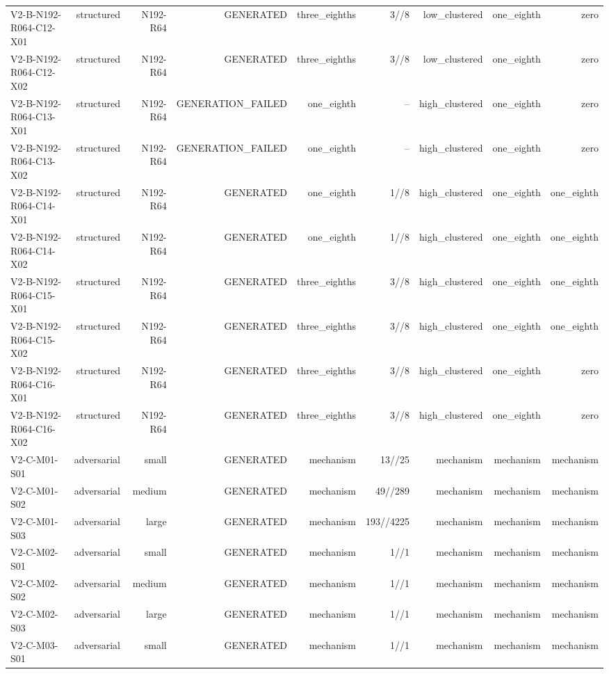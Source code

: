 {\begin{longtable}{lrrrrrrrr}
V2-B-N192-R064-C12-X01 & structured & N192-R64 & GENERATED & three\_eighths & 3//8 & low\_clustered & one\_eighth & zero \\
V2-B-N192-R064-C12-X02 & structured & N192-R64 & GENERATED & three\_eighths & 3//8 & low\_clustered & one\_eighth & zero \\
V2-B-N192-R064-C13-X01 & structured & N192-R64 & GENERATION\_FAILED & one\_eighth & -- & high\_clustered & one\_eighth & zero \\
V2-B-N192-R064-C13-X02 & structured & N192-R64 & GENERATION\_FAILED & one\_eighth & -- & high\_clustered & one\_eighth & zero \\
V2-B-N192-R064-C14-X01 & structured & N192-R64 & GENERATED & one\_eighth & 1//8 & high\_clustered & one\_eighth & one\_eighth \\
V2-B-N192-R064-C14-X02 & structured & N192-R64 & GENERATED & one\_eighth & 1//8 & high\_clustered & one\_eighth & one\_eighth \\
V2-B-N192-R064-C15-X01 & structured & N192-R64 & GENERATED & three\_eighths & 3//8 & high\_clustered & one\_eighth & one\_eighth \\
V2-B-N192-R064-C15-X02 & structured & N192-R64 & GENERATED & three\_eighths & 3//8 & high\_clustered & one\_eighth & one\_eighth \\
V2-B-N192-R064-C16-X01 & structured & N192-R64 & GENERATED & three\_eighths & 3//8 & high\_clustered & one\_eighth & zero \\
V2-B-N192-R064-C16-X02 & structured & N192-R64 & GENERATED & three\_eighths & 3//8 & high\_clustered & one\_eighth & zero \\
V2-C-M01-S01 & adversarial & small & GENERATED & mechanism & 13//25 & mechanism & mechanism & mechanism \\
V2-C-M01-S02 & adversarial & medium & GENERATED & mechanism & 49//289 & mechanism & mechanism & mechanism \\
V2-C-M01-S03 & adversarial & large & GENERATED & mechanism & 193//4225 & mechanism & mechanism & mechanism \\
V2-C-M02-S01 & adversarial & small & GENERATED & mechanism & 1//1 & mechanism & mechanism & mechanism \\
V2-C-M02-S02 & adversarial & medium & GENERATED & mechanism & 1//1 & mechanism & mechanism & mechanism \\
V2-C-M02-S03 & adversarial & large & GENERATED & mechanism & 1//1 & mechanism & mechanism & mechanism \\
V2-C-M03-S01 & adversarial & small & GENERATED & mechanism & 1//1 & mechanism & mechanism & mechanism \\

\end{longtable}}

